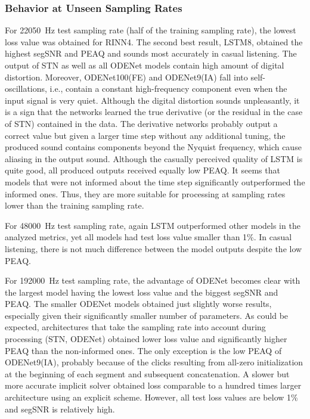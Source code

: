 \subsubsection{Behavior at Unseen Sampling Rates}

For \SI{22050}{Hz} test sampling rate (half of the training sampling rate), the lowest loss value was obtained for \ac{RINN}4. The second best result, \ac{LSTM}8, obtained the highest \ac{segSNR} and \ac{PEAQ} and sounds most accurately in casual listening. The output of \ac{STN} as well as all ODENet models contain high amount of digital distortion. Moreover, ODENet100(FE) and ODENet9(IA) fall into self-oscillations, i.e., contain a constant high-frequency component even when the input signal is very quiet. Although the digital distortion sounds unpleasantly, it is a sign that the networks learned the true derivative (or the residual in the case of \ac{STN}) contained in the data. The derivative networks probably output a correct value but given a larger time step without any additional tuning, the produced sound contains components beyond the Nyquist frequency, which cause aliasing in the output sound. Although the casually perceived quality of \ac{LSTM} is quite good, all produced outputs received equally low \ac{PEAQ}. It seems that models that were not informed about the time step significantly outperformed the informed ones. Thus, they are more suitable for processing at sampling rates lower than the training sampling rate.

For \SI{48000}{Hz} test sampling rate, again \ac{LSTM} outperformed other models in the analyzed metrics, yet all models had test loss value smaller than 1\%. In casual listening, there is not much difference between the model outputs despite the low \ac{PEAQ}.

For \SI{192000}{Hz} test sampling rate, the advantage of ODENet becomes clear with the largest model having the lowest loss value and the biggest \ac{segSNR} and \ac{PEAQ}. The smaller ODENet models obtained just slightly worse results, especially given their significantly smaller number of parameters. As could be expected, architectures that take the sampling rate into account during processing (\ac{STN}, ODENet) obtained lower loss value and significantly higher \ac{PEAQ} than the non-informed ones. The only exception is the low \ac{PEAQ} of ODENet9(IA), probably because of the clicks resulting from all-zero initialization at the beginning of each segment and subsequent concatenation. A slower but more accurate implicit solver obtained loss comparable to a hundred times larger architecture using an explicit scheme. However, all test loss values are below 1\% and \ac{segSNR} is relatively high.

